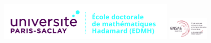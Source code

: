 \documentclass[a4paper,12pt]{book}
\begin{document}
{\setlength{\baselineskip}{0.8\baselineskip}
\vspace{-2cm}
\voffset-10pt
\noindent
\hspace*{-1cm}\hbox{\includegraphics[width=8.6cm]{ed_edmh-h.jpg}} 
\hfill
\hbox{\includegraphics[width=2cm]{logoensae-psay.jpg}}
\vspace{7mm}

}
\end{document}
